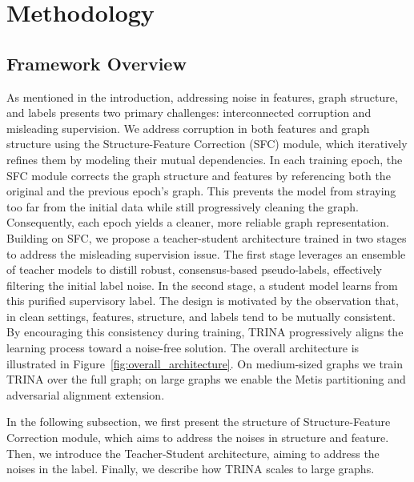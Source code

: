 \documentclass[sigconf, anonymous, review]{acmart}
\begin{document}
\section{Methodology}
  \subsection{Framework Overview}
    As mentioned in the introduction, addressing noise in features, graph structure, and labels presents two primary challenges: interconnected corruption and misleading supervision.
    We address corruption in both features and graph structure using the Structure-Feature Correction (SFC) module, which iteratively refines them by modeling their mutual dependencies. In each training epoch, the SFC module corrects the graph structure and features by referencing both the original and the previous epoch's graph. This prevents the model from straying too far from the initial data while still progressively cleaning the graph. Consequently, each epoch yields a cleaner, more reliable graph representation.
    Building on SFC, we propose a teacher-student architecture trained in two stages to address the misleading supervision issue. The first stage leverages an ensemble of teacher models to distill robust, consensus-based pseudo-labels, effectively filtering the initial label noise. In the second stage, a student model learns from this purified supervisory label. 
    The design is motivated by the observation that, in clean settings, features, structure, and labels tend to be mutually consistent. By encouraging this consistency during training, TRINA progressively aligns the learning process toward a noise-free solution.
    The overall architecture is illustrated in Figure~\ref{fig:overall_architecture}.
    On medium-sized graphs we train TRINA over the full graph; on large graphs we enable the Metis partitioning and adversarial alignment extension.

    In the following subsection, we first present the structure of Structure-Feature Correction module, which aims to address the noises in structure and feature. Then, we introduce the Teacher-Student architecture, aiming to address the noises in the label. Finally, we describe how TRINA scales to large graphs.
\end{document}
